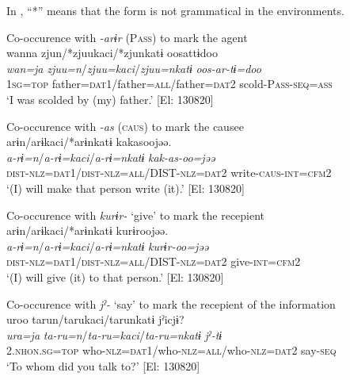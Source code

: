 In , “*” means that the form is not grammatical in the environments.

\ea\label{ex:6-82}
\ea Co-occurence with \textit{-arɨr} (P\textsc{ass}) to mark the agent\\
{\TM}
\glll wanna  zjun/*zjuukaci/*zjunkatɨ  oosattɨdoo\\
\textit{wan=ja}  \textit{zjuu=n}/\textit{zjuu=kaci}/\textit{zjuu=nkatɨ}  \textit{oos-ar-tɨ=doo}\\
    1\textsc{sg}=\textsc{top}  father=\textsc{dat}1/father=\textsc{all}/father=\textsc{dat2}  scold-P\textsc{ass}-\textsc{seq}=\textsc{ass}\\
\glt    ‘I was scolded by (my) father.’ [El: 130820]

\ex Co-occurence with \textit{-as} (\textsc{caus}) to mark the causee\\

{\TM}
\glll arɨn/arɨkaci/*arɨnkatɨ  kakasoojəə.\\
\textit{a-rɨ=n}/\textit{a-rɨ=kaci}/\textit{a-rɨ=nkatɨ}  \textit{kak-as-oo=jəə}\\
    \textsc{dist}-\textsc{nlz}=\textsc{dat}1/\textsc{dist}-\textsc{nlz}=\textsc{all}/DIST-\textsc{nlz}=\textsc{dat2}  write-\textsc{caus}-\textsc{int}=\textsc{cfm}2\\
\glt    ‘(I) will make that person write (it).’ [El: 130820]

\ex Co-occurence with \textit{kurɨr-} ‘give’ to mark the recepient\\

{\TM}
\glll arɨn/arɨkaci/*arɨnkatɨ  kurɨroojəə.\\
\textit{a-rɨ=n}/\textit{a-rɨ=kaci}/\textit{a-rɨ=nkatɨ}  \textit{kurɨr-oo=jəə}\\
    \textsc{dist}-\textsc{nlz}=\textsc{dat}1/\textsc{dist}-\textsc{nlz}=\textsc{all}/DIST-\textsc{nlz}=\textsc{dat2}  give-\textsc{int}=\textsc{cfm}2\\
\glt    ‘(I) will give (it) to that person.’ [El: 130820]

\ex Co-occurence with \textit{jˀ-} ‘say’ to mark the recepient of the information\\

{\TM}
\glll uroo  tarun/tarukaci/tarunkatɨ  jˀicjɨ?\\
\textit{ura=ja}  \textit{ta-ru=n}/\textit{ta-ru=kaci}/\textit{ta-ru=nkatɨ}  \textit{jˀ-tɨ}\\
    2.\textsc{nhon}.\textsc{sg}=\textsc{top}  who-\textsc{nlz}=\textsc{dat}1/who-\textsc{nlz}=\textsc{all}/who-\textsc{nlz}=\textsc{dat2}  say-\textsc{seq}\\
\glt    ‘To whom did you talk to?’ [El: 130820]

